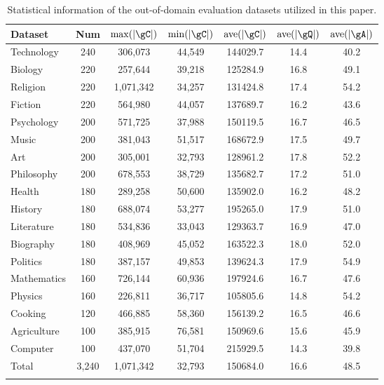 \documentclass[sigconf]{acmart}
\begin{document}
\begin{table}[h]
\caption{Statistical information of the out-of-domain evaluation datasets utilized in this paper.}
\small
    \centering
\begin{tabular}{lcccccc}
\toprule
Dataset & Num & $\max(|\gC|)$ & $\min(|\gC|)$ & $\text{ave}(|\gC|)$ & $\text{ave}(|\gQ|)$ & $\text{ave}(|\gA|)$ \\
\midrule
Technology & 240 & 306,073 & 44,549 & 144029.7 & 14.4 & 40.2 \\
Biology & 220 & 257,644 & 39,218 & 125284.9 & 16.8 & 49.1 \\
Religion & 220 & 1,071,342 & 34,257 & 131424.8 & 17.4 & 54.2 \\
Fiction & 220 & 564,980 & 44,057 & 137689.7 & 16.2 & 43.6 \\
Psychology & 200 & 571,725 & 37,988 & 150119.5 & 16.7 & 46.5 \\
Music & 200 & 381,043 & 51,517 & 168672.9 & 17.5 & 49.7 \\
Art & 200 & 305,001 & 32,793 & 128961.2 & 17.8 & 52.2 \\
Philosophy & 200 & 678,553 & 38,729 & 135682.7 & 17.2 & 51.0 \\
Health & 180 & 289,258 & 50,600 & 135902.0 & 16.2 & 48.2 \\
History & 180 & 688,074 & 53,277 & 195265.0 & 17.9 & 51.0 \\
Literature & 180 & 534,836 & 33,043 & 129363.7 & 16.9 & 47.0 \\
Biography & 180 & 408,969 & 45,052 & 163522.3 & 18.0 & 52.0 \\
Politics & 180 & 387,157 & 49,853 & 139624.3 & 17.9 & 54.9 \\
Mathematics & 160 & 726,144 & 60,936 & 197924.6 & 16.7 & 47.6 \\
Physics & 160 & 226,811 & 36,717 & 105805.6 & 14.8 & 54.2 \\
Cooking & 120 & 466,885 & 58,360 & 156139.2 & 16.5 & 46.6 \\
Agriculture & 100 & 385,915 & 76,581 & 150969.6 & 15.6 & 45.9 \\
Computer & 100 & 437,070 & 51,704 & 215929.5 & 14.3 & 39.8 \\
\midrule
Total & 3,240 & 1,071,342 & 32,793 & 150684.0 & 16.6 & 48.5 \\
\bottomrule
\label{tab:outdomain}
\end{tabular}
\end{table}
\end{document}
